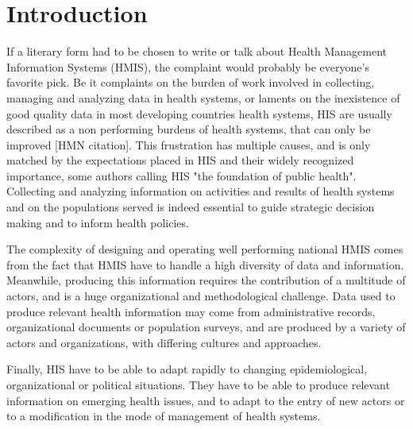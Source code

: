 \section{Introduction}



If a literary form had to be chosen to write or talk about Health Management Information Systems (HMIS), the complaint would probably be everyone's favorite pick. Be it complaints on the burden of work involved in collecting, managing and analyzing data in health systems, or laments on the inexistence of good quality data in most developing countries health systems, HIS are usually described as a non performing burdens of health systems, that can only be improved [HMN citation]. This frustration has multiple causes, and is only matched by the expectations placed in HIS and their widely recognized importance, some authors calling HIS "the foundation of public health"\cite{foundph}. Collecting and analyzing information on activities and results of health systems and on the populations served is indeed essential to guide strategic decision making and to inform health policies.

The complexity of designing and operating well performing national HMIS comes from the fact that HMIS have to handle a high diversity of data and information. Meanwhile, producing this information requires the contribution of a multitude of actors, and is a huge organizational and methodological challenge. Data used to produce relevant health information may come from administrative records, organizational documents or population surveys, and are produced by a variety of actors and organizations, with differing cultures and approaches.

Finally, HIS have to be able to adapt rapidly to changing epidemiological, organizational or political situations. They have to be able to produce relevant information on emerging health issues, and to adapt to the entry of new actors or to a modification in the mode of management of health systems.

